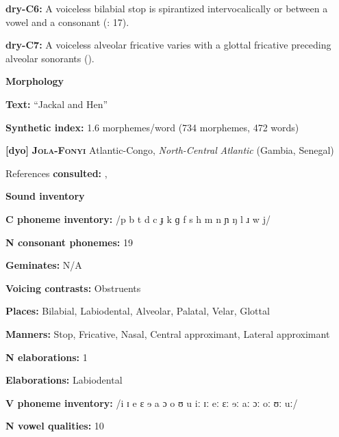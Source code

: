 \textbf{dry-C6:} A voiceless bilabial stop is spirantized intervocalically or between a vowel and a consonant (\citealt{KotapishKotapish1978}: 17).



\textbf{dry-C7:} A voiceless alveolar fricative varies with a glottal fricative preceding alveolar sonorants (\citealt{KotapishKotapish1978}).



\textbf{Morphology}



\textbf{Text:} “Jackal and Hen” \citep[180-192]{Dhakal2012}



\textbf{Synthetic index:} 1.6 morphemes/word (734 morphemes, 472 words)



\textbf{[dyo]}   \textbf{\textsc{Jola-Fonyi}}  Atlantic-Congo, \textit{North-Central} \textit{Atlantic} (Gambia, Senegal)



References \textbf{consulted:} \citet{Lavergne1979}, \citet{Sapir1965}



\textbf{Sound inventory}



\textbf{C phoneme inventory:} /p b t d c ɟ k ɡ f s h m n ɲ ŋ l ɹ w j/



\textbf{N consonant phonemes:} 19



\textbf{Geminates:} N/A



\textbf{Voicing contrasts:} Obstruents



\textbf{Places:} Bilabial, Labiodental, Alveolar, Palatal, Velar, Glottal



\textbf{Manners:} Stop, Fricative, Nasal, Central approximant, Lateral approximant



\textbf{N elaborations:} 1



\textbf{Elaborations:} Labiodental



\textbf{V phoneme inventory:} /i ɪ e ɛ ɘ a ɔ o ʊ u iː ɪː eː ɛː ɘː aː ɔː oː ʊː uː/



\textbf{N vowel qualities:} 10



